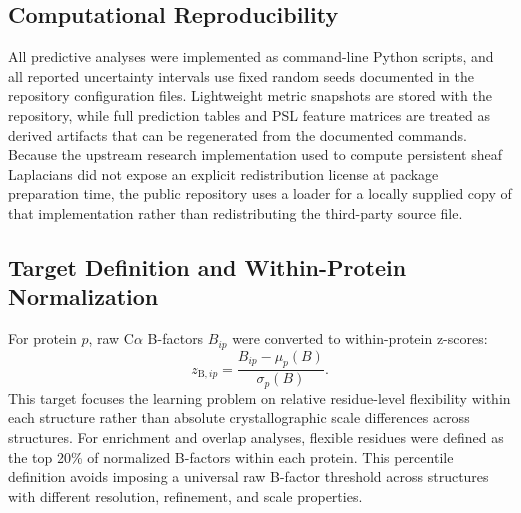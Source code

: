\documentclass[11pt]{article}
\newcommand{\calpha}{C\ensuremath{\alpha}\xspace}
\begin{document}
\begin{table}[htbp]
\centering
\caption{Dataset summary.}
\label{tab:dataset_summary}
\end{table}

\subsection{Computational Reproducibility}
All predictive analyses were implemented as command-line Python scripts, and all reported uncertainty intervals use fixed random seeds documented in the repository configuration files. Lightweight metric snapshots are stored with the repository, while full prediction tables and PSL feature matrices are treated as derived artifacts that can be regenerated from the documented commands. Because the upstream research implementation used to compute persistent sheaf Laplacians did not expose an explicit redistribution license at package preparation time, the public repository uses a loader for a locally supplied copy of that implementation rather than redistributing the third-party source file.

\subsection{Target Definition and Within-Protein Normalization}
For protein $p$, raw \calpha B-factors $B_{ip}$ were converted to within-protein z-scores:
\begin{equation}
z_{\mathrm{B},ip} = \frac{B_{ip} - \mu_p(B)}{\sigma_p(B)}.
\end{equation}
This target focuses the learning problem on relative residue-level flexibility within each structure rather than absolute crystallographic scale differences across structures. For enrichment and overlap analyses, flexible residues were defined as the top 20\% of normalized B-factors within each protein. This percentile definition avoids imposing a universal raw B-factor threshold across structures with different resolution, refinement, and scale properties.
\end{document}

